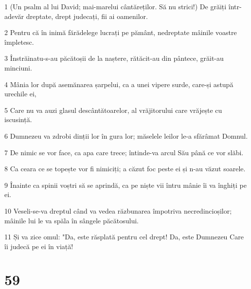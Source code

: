 \par 1 (Un psalm al lui David; mai-marelui cântăreților. Să nu strici!) De grăiți într-adevăr dreptate, drept judecați, fii ai oamenilor.
\par 2 Pentru că în inimă fărădelege lucrați pe pământ, nedreptate mâinile voastre împletesc.
\par 3 Înstrăinatu-s-au păcătoșii de la naștere, rătăcit-au din pântece, grăit-au minciuni.
\par 4 Mânia lor după asemănarea șarpelui, ca a unei vipere surde, care-și astupă urechile ei,
\par 5 Care nu va auzi glasul descântătoarelor, al vrăjitorului care vrăjește cu iscusință.
\par 6 Dumnezeu va zdrobi dinții lor în gura lor; măselele leilor le-a sfărâmat Domnul.
\par 7 De nimic se vor face, ca apa care trece; întinde-va arcul Său până ce vor slăbi.
\par 8 Ca ceara ce se topește vor fi nimiciți; a căzut foc peste ei și n-au văzut soarele.
\par 9 Înainte ca spinii voștri să se aprindă, ca pe niște vii întru mânie îi va înghiți pe ei.
\par 10 Veseli-se-va dreptul când va vedea răzbunarea împotriva necredincioșilor; mâinile lui le va spăla în sângele păcătosului.
\par 11 Și va zice omul: "Da, este răsplată pentru cel drept! Da, este Dumnezeu Care îi judecă pe ei în viață!

\chapter{59}

